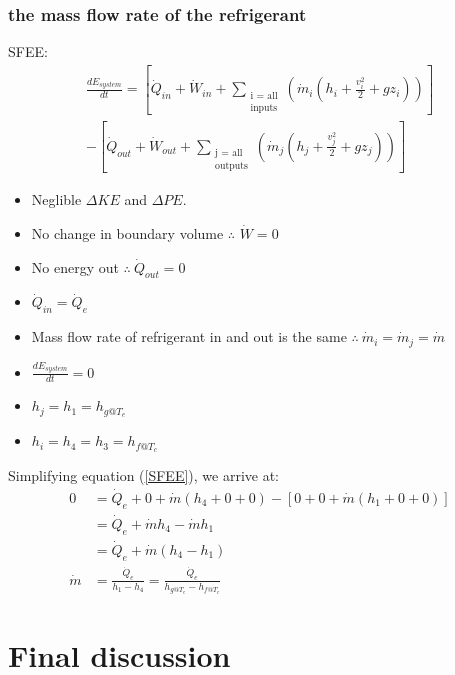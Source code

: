 \documentclass[12pt]{article}
\numberwithin{equation}{section}
\begin{document}
\begin{flushleft}
\subsubsection[Refrigerant mass flow rate.]{the mass flow rate of the refrigerant}
SFEE:
\begin{multline}
  \frac{dE_{system}}{dt} = \left[ \dot{Q}_{in} + \dot{W}_{in} + \sum_{\substack{\text{i = all} \\ \text{inputs}}} \left( \dot{m}_i (h_i + \frac{v_i^2}{2} + gz_i) \right) \right] \\ - \left[ \dot{Q}_{out} + \dot{W}_{out} + \sum_{\substack{\text{j = all} \\ \text{outputs}}} \left( \dot{m}_j (h_j + \frac{v_j^2}{2} + gz_j) \right) \right]
  \label{SFEE}
\end{multline}
\begin{itemize}
  \item Neglible $\Delta KE$ and $\Delta PE$.
  \item No change in boundary volume $\therefore$ $\dot{W} = 0$
  \item No energy out $\therefore \ \dot{Q}_{out} = 0$
  \item $\dot{Q}_{in} = \dot{Q}_e$
  \item Mass flow rate of refrigerant in and out is the same $\therefore \ \dot{m}_i =\dot{m}_j = \dot{m}$
  \item $\frac{dE_{system}}{dt} = 0$
  \item $h_j = h_1 = h_{g@T_e}$
  \item $h_i = h_4 = h_3 = h_{f@T_c}$
\end{itemize}  
Simplifying equation (\ref{SFEE}), we arrive at:
\begin{align}
  0 &= \dot{Q}_{e} + 0 + \dot{m} (h_4 + 0 + 0) - \left[ 0 + 0 +  \dot{m} (h_1 + 0 + 0) \right]\\
  &= \dot{Q}_{e} + \dot{m} h_4 - \dot{m} h_1\\
  &= \dot{Q}_{e} + \dot{m} (h_4 - h_1)\\
  \dot{m} &= \frac{\dot{Q}_e}{h_1 - h_4} = \frac{\dot{Q}_e}{h_{g@T_e} - h_{f@T_c}}
\end{align}
\section{Final discussion}

\end{flushleft}
\end{document}
